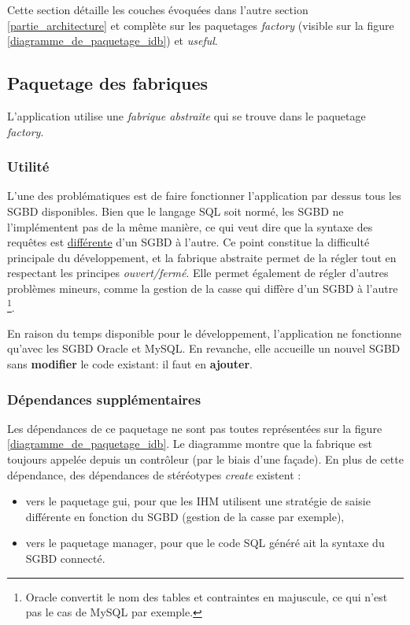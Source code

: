 Cette section détaille les couches évoquées dans l'autre section \ref{partie_architecture} et complète sur les paquetages \textit{factory} (visible sur la figure \ref{diagramme_de_paquetage_idb}) et \textit{useful}.

\subsection{Paquetage des fabriques}
L'application utilise une \textit{fabrique abstraite} qui se trouve dans le paquetage \textit{factory}.

\subsubsection{Utilité}
L'une des problématiques est de faire fonctionner l'application par dessus tous les SGBD disponibles.
Bien que le langage SQL soit normé, les SGBD ne l'implémentent pas de la même manière, ce qui veut dire que la syntaxe des requêtes est \underline{différente} d'un SGBD à l'autre.
Ce point constitue la difficulté principale du développement, et la fabrique abstraite permet de la régler tout en respectant les principes \textit{ouvert/fermé}. Elle permet également de régler d'autres problèmes mineurs, comme la gestion de la casse qui diffère d'un SGBD à l'autre
\footnote{\label{casse_et_sgbd}Oracle convertit le nom des tables et contraintes en majuscule, ce qui n'est pas le cas de MySQL par exemple.}.

En raison du temps disponible pour le développement, l'application ne fonctionne qu'avec les SGBD Oracle et MySQL.
En revanche, elle accueille un nouvel SGBD sans \textbf{modifier} le code existant: il faut en \textbf{ajouter}.

\subsubsection{Dépendances supplémentaires}
Les dépendances de ce paquetage ne sont pas toutes représentées sur la figure \ref{diagramme_de_paquetage_idb}.
Le diagramme montre que la fabrique est toujours appelée depuis un contrôleur (par le biais d'une façade).
En plus de cette dépendance, des dépendances de stéréotypes \textit{create} existent :
\begin{itemize}
\item vers le paquetage gui, pour que les IHM utilisent une stratégie de saisie différente en fonction du SGBD (gestion de la casse par exemple),
\item vers le paquetage manager, pour que le code SQL généré ait la syntaxe du SGBD connecté.
\end{itemize}

